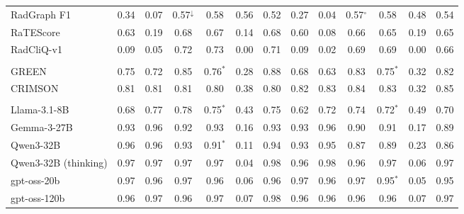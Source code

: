 \begin{tabular}{lcccccccccccc}
RadGraph F1 & 0.34 & 0.07 & 0.57$^{\downarrow}$ & 0.58 & 0.56 & 0.52 & 0.27 & 0.04 & 0.57$^{\circ}$ & 0.58 & 0.48 & 0.54 \\
RaTEScore & 0.63 & 0.19 & 0.68 & 0.67 & 0.14 & 0.68 & 0.60 & 0.08 & 0.66 & 0.65 & 0.19 & 0.65 \\
RadCliQ-v1 & 0.09 & 0.05 & 0.72 & 0.73 & 0.00 & 0.71 & 0.09 & 0.02 & 0.69 & 0.69 & 0.00 & 0.66 \\
\addlinespace[2pt]
\multicolumn{13}{l}{\textit{LLM-based metrics}} \\
GREEN & 0.75 & 0.72 & 0.85 & 0.76$^{\ast}$ & 0.28 & 0.88 & 0.68 & 0.63 & 0.83 & 0.75$^{\ast}$ & 0.32 & 0.82 \\
CRIMSON & 0.81 & 0.81 & 0.81 & 0.80 & 0.38 & 0.80 & 0.82 & 0.83 & 0.84 & 0.83 & 0.32 & 0.85 \\
\addlinespace[2pt]
\multicolumn{13}{l}{\textit{LLM judges (rubric prompt)}} \\
Llama-3.1-8B & 0.68 & 0.77 & 0.78 & 0.75$^{\ast}$ & 0.43 & 0.75 & 0.62 & 0.72 & 0.74 & 0.72$^{\ast}$ & 0.49 & 0.70 \\
Gemma-3-27B & 0.93 & 0.96 & 0.92 & 0.93 & 0.16 & 0.93 & 0.93 & 0.96 & 0.90 & 0.91 & 0.17 & 0.89 \\
Qwen3-32B & 0.96 & 0.96 & 0.93 & 0.91$^{\ast}$ & 0.11 & 0.94 & 0.93 & 0.95 & 0.87 & 0.89 & 0.23 & 0.86 \\
Qwen3-32B (thinking) & 0.97 & 0.97 & 0.97 & 0.97 & 0.04 & 0.98 & 0.96 & 0.98 & 0.96 & 0.97 & 0.06 & 0.97 \\
gpt-oss-20b & 0.97 & 0.96 & 0.97 & 0.96 & 0.06 & 0.96 & 0.97 & 0.96 & 0.97 & 0.95$^{\ast}$ & 0.05 & 0.95 \\
gpt-oss-120b & 0.96 & 0.97 & 0.96 & 0.97 & 0.07 & 0.98 & 0.96 & 0.96 & 0.96 & 0.96 & 0.07 & 0.97 \\
\bottomrule
\end{tabular}
